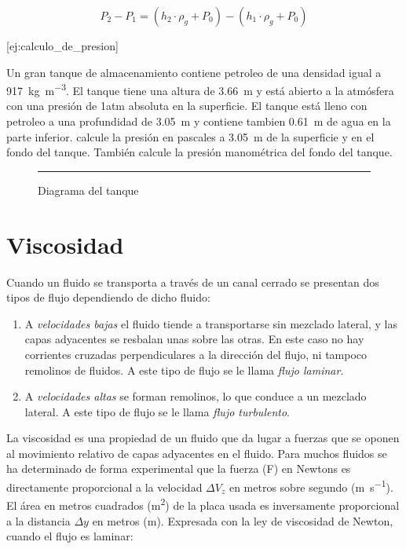 \documentclass{AsignaturaResumen}
\begin{document}
\begin{equation}
    P_{2} - P_{1} = (h_{2} \cdot \rho_{g} + P_{0}) - (h_{1} \cdot \rho_{g} + P_{0})
\end{equation}

[ej:calculo_de_presion]{
    Un gran tanque de almacenamiento contiene petroleo de una densidad igual a \qty{917}{\kg\per\m\cubed}. El tanque tiene una altura de \qty{3.66}{\m} y está abierto a la atmósfera con una presión de 1atm absoluta en la superficie. El tanque está lleno con petroleo a una profundidad de \qty{3.05}{\m} y contiene tambien \qty{0.61}{\m} de agua en la parte inferior. calcule la presión en pascales a \qty{3.05}{\m} de la superficie y en el fondo del tanque. También calcule la presión manométrica del fondo del tanque.
    \begin{figure}[H]
        \centering
        \resizebox{0.45\linewidth}{!}{}
        \rule{\linewidth}{0.5pt}
        \caption{Diagrama del tanque}
    \end{figure}
}


\section{Viscosidad} %

Cuando un fluido se transporta a través de un canal cerrado se presentan dos tipos de flujo dependiendo de dicho fluido:

\begin{enumerate}
    \item A \emph{velocidades bajas} el fluido tiende a transportarse sin mezclado lateral, y las capas adyacentes se resbalan unas sobre las otras. En este caso no hay corrientes cruzadas perpendiculares a la dirección del flujo, ni tampoco remolinos de fluidos. A este tipo de flujo se le llama \emph{flujo laminar}.
    \item A \emph{velocidades altas} se forman remolinos, lo que conduce a un mezclado lateral. A este tipo de flujo se le llama \emph{flujo turbulento}.
\end{enumerate}

La viscosidad es una propiedad de un fluido que da lugar a fuerzas que se oponen al movimiento relativo de capas adyacentes en el fluido. Para muchos fluidos se ha determinado de forma experimental que la fuerza (F) en Newtons es directamente proporcional a la velocidad $\Delta V_{z}$ en metros sobre segundo (\unit{\m\per\s}). El área en metros cuadrados (\unit{\m\squared}) de la placa usada es inversamente proporcional a la distancia $\Delta y$ en metros (\unit{\m}). Expresada con la ley de viscosidad de Newton, cuando el flujo es laminar:
\end{document}
